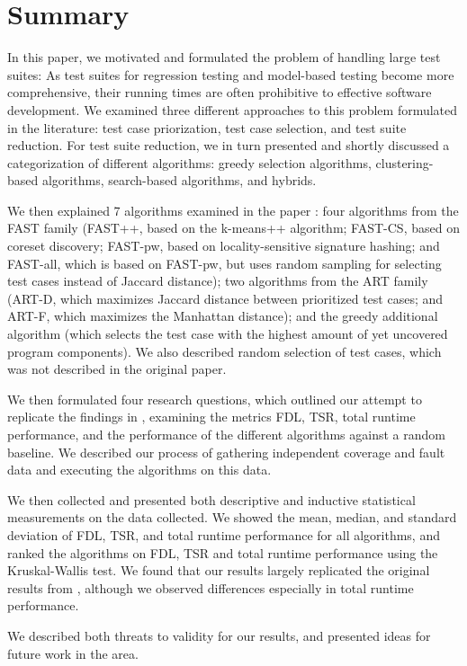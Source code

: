 
\chapter{Summary}\label{chapter:summary}

In this paper, we motivated and formulated the problem of handling large
test suites: As test suites for regression testing and model-based testing
become more comprehensive, their running times are often prohibitive to
effective software development. We examined three different approaches
to this problem formulated in the literature: test case priorization,
test case selection, and test suite reduction. For test suite reduction,
we in turn presented and shortly discussed a categorization of different
algorithms: greedy selection algorithms, clustering-based algorithms,
search-based algorithms, and hybrids.

We then explained 7 algorithms examined in the paper
\cite{cruciani2019scalable}: four algorithms from the FAST family (FAST++,
based on the k-means++ algorithm; FAST-CS, based on coreset discovery;
FAST-pw, based on locality-sensitive signature hashing; and FAST-all,
which is based on FAST-pw, but uses random sampling for selecting test
cases instead of Jaccard distance); two algorithms from the ART family
(ART-D, which maximizes Jaccard distance between prioritized test cases;
and ART-F, which maximizes the Manhattan distance); and the greedy
additional algorithm (which selects the test case with the highest amount
of yet uncovered program components). We also described random selection
of test cases, which was not described in the original paper.

We then formulated four research questions, which outlined our attempt
to replicate the findings in \cite{cruciani2019scalable}, examining
the metrics FDL, TSR, total runtime performance, and the performance
of the different algorithms against a random baseline. We described our
process of gathering independent coverage and fault data and executing
the algorithms on this data.

We then collected and presented both descriptive and inductive statistical
measurements on the data collected. We showed the mean, median, and
standard deviation of FDL, TSR, and total runtime performance for all
algorithms, and ranked the algorithms on FDL, TSR and total runtime
performance using the Kruskal-Wallis test. We found that our results largely
replicated the original results from \cite{cruciani2019scalable}, although
we observed differences especially in total runtime performance.

We described both threats to validity for our results, and presented
ideas for future work in the area.

